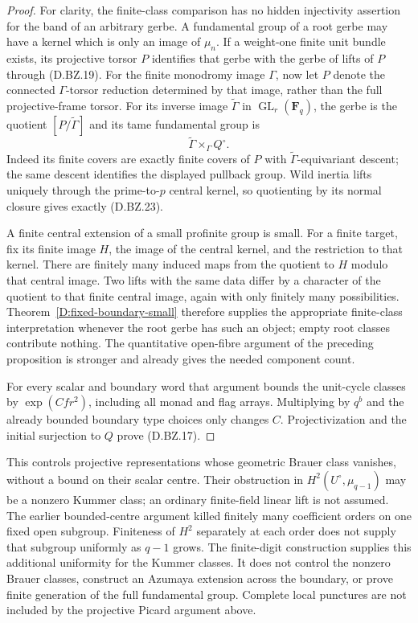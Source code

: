 \begin{proof}
For clarity, the finite-class comparison
has no hidden injectivity assertion for
the band of an arbitrary gerbe.  A
fundamental group of a root gerbe may
have a kernel which is only an image of
$\mu_n$.  If a weight-one finite unit
bundle exists, its projective torsor
$P$ identifies that gerbe with the
gerbe of lifts of $P$ through (D.BZ.19).
For the finite monodromy image $\Gamma$, now
let $P$ denote the connected $\Gamma$-torsor
reduction determined by that image, rather
than the full projective-frame torsor.
For its inverse image
$\widetilde\Gamma$ in
$\operatorname{GL}_r(\mathbf F_q)$,
the gerbe is the quotient
$[P/\widetilde\Gamma]$ and its tame
fundamental group is
\[
                  \widetilde\Gamma
                          \times_\Gamma Q^\circ.
                                                        \tag{D.BZ.23}
\]
Indeed its finite covers are exactly
finite covers of $P$ with
$\widetilde\Gamma$-equivariant descent;
the same descent identifies the displayed
pullback group.  Wild inertia lifts
uniquely through the prime-to-$p$
central kernel, so quotienting by its
normal closure gives exactly (D.BZ.23).

A finite central extension of a small
profinite group is small.  For a finite
target, fix its finite image $H$, the
image of the central kernel, and the
restriction to that kernel.  There
are finitely many induced maps from
the quotient to $H$ modulo that central
image.  Two lifts with the same data
differ by a character of the quotient
to that finite central image, again
with only finitely many possibilities.
Theorem~\ref{D:fixed-boundary-small}
therefore supplies the appropriate
finite-class interpretation whenever
the root gerbe has such an object;
empty root classes contribute nothing.
The quantitative open-fibre argument
of the preceding proposition is
stronger and already gives the needed
component count.

For every scalar and boundary word that
argument bounds the unit-cycle classes
by $\exp(Cfr^2)$, including all monad
and flag arrays.  Multiplying by
$q^b$ and the already bounded boundary
type choices only changes $C$.
Projectivization and the initial
surjection to $Q$ prove (D.BZ.17).
\end{proof}

\begin{remark}
This controls projective representations whose geometric
Brauer class vanishes, without a bound on their scalar
centre.  Their obstruction in $H^2(U^\circ,\mu_{q-1})$
may be a nonzero Kummer class; an ordinary finite-field
linear lift is not assumed.  The earlier bounded-centre
argument killed finitely many coefficient orders on one
fixed open subgroup.  Finiteness of $H^2$ separately at
each order does not supply that subgroup uniformly as
$q-1$ grows.  The finite-digit construction supplies this
additional uniformity for the Kummer classes.
It does not control the nonzero Brauer classes,
construct an Azumaya extension across the boundary, or
prove finite generation of the full fundamental group.
Complete local punctures are not included by the
projective Picard argument above.
\end{remark}
